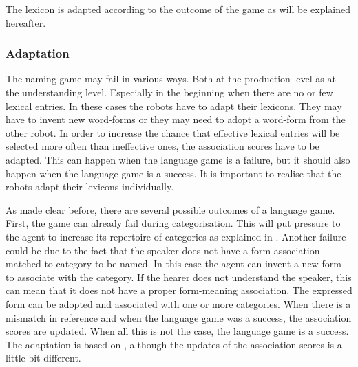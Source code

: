 The lexicon is adapted according to the outcome of the game as will be explained hereafter.

\subsubsection{Adaptation}

The naming game may fail in various ways. Both at the production level as at the understanding level. Especially in the beginning when there are no or few lexical entries. In these cases the robots have to adapt their lexicons. They may have to invent new word-forms or they may need to adopt a word-form from the other robot. In order to increase the chance that effective lexical entries will be selected more often than ineffective ones, the association scores have to be adapted. This can happen when the language game is a failure, but it should also happen when the language game is a success. It is important to realise that the robots adapt their lexicons individually.


As made clear before, there are several possible outcomes of a language game. First, the game can already fail during categorisation. This will put pressure to the agent to increase its repertoire of categories as explained in . Another failure could be due to the fact that the speaker does not have a form association matched to category to be named. In this case the agent can invent a new form to associate with the category. If the hearer does not understand the speaker, this can mean that it does not have a proper form-meaning association. The expressed form can be adopted and associated with one or more categories. When there is a mismatch in reference and when the language game was a success, the association scores are updated. When all this is not the case, the language game is a success. The adaptation is based on \citep{steels:1996a}, although the updates of the association scores is a little bit different.

